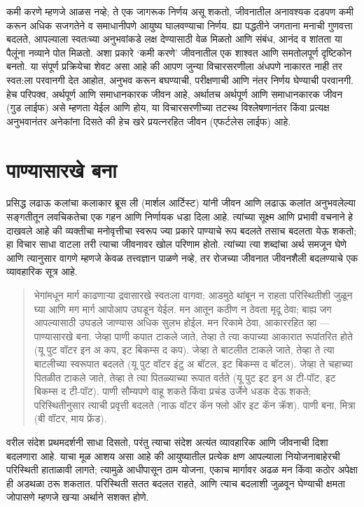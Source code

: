 कमी करणे म्हणजे आळस नव्हे; ते एक जागरूक निर्णय असू शकतो, जीवनातील अनावश्यक दडपण कमी करून अधिक सजगतेने व समाधानीपणे आयुष्य घालवण्याचा निर्णय. ह्या पद्धतीने जगताना मनाची गुणवत्ता बदलते, आपल्याला स्वतःच्या अनुभवांकडे लक्ष देण्यासाठी वेळ मिळतो आणि संबंध, आनंद व शांतता या पैलूंना नव्याने पोत मिळतो. अशा प्रकारे ‘कमी करणे’ जीवनातील एक शाश्वत आणि समतोलपूर्ण दृष्टिकोन बनतो.
या संपूर्ण प्रक्रियेचा शेवट असा आहे की आपण जुन्या विचारसरणीला अंधपणे नाकारत नाही तर स्वत:ला परवानगी देत आहोत, अनुभव करून बघण्याची, परीक्षणाची आणि नंतर निर्णय घेण्याची परवानगी. हेच परिपक्व, अर्थपूर्ण आणि समाधानकारक जीवन आहे, अर्थातच अर्थपूर्ण आणि समाधानकारक जीवन (गुड लाईफ) असे म्हणता येईल आणि होय, या विचारसरणीच्या तटस्थ विश्लेषणानंतर किंवा प्रत्यक्ष अनुभवानंतर अनेकांना दिसते की हेच खरे प्रयत्नरहित जीवन (एफर्टलेस लाईफ) आहे.
\chapter{पाण्यासारखे बना}
प्रसिद्ध लढाऊ कलांचा कलाकार ब्रूस ली (मार्शल आर्टिस्ट) यांनी जीवन आणि लढाऊ कलांत अनुभवलेल्या सङ्गतीतून लवचिकतेचा एक गहन आणि निर्णायक धडा दिला आहे. त्यांच्या सूक्ष्म आणि प्रभावी वचनाने हे दाखवले आहे की व्यक्तीचा मनोवृत्तीचा स्वरूप ज्या प्रकारे पाण्याचे रूप बदलते तसाच बदलता येऊ शकतो; हा विचार साधा वाटला तरी त्याचा जीवनावर खोल परिणाम होतो. त्यांच्या त्या शब्दांचा अर्थ समजून घेणे आणि त्यानुसार वागणे म्हणजे केवळ तत्त्वज्ञान पाळणे नव्हे, तर रोजच्या जीवनात जीवनशैली बदलण्याचे एक व्यावहारिक सूत्र आहे.
\begin{quote}
 भेगांमधून मार्ग काढणाऱ्या द्रवासारखे स्वतःला वागवा; आडमुठे थांबून न राहता परिस्थितीशी जुळून घ्या आणि मग मार्ग आपोआप उघडून येईल.
 मन आतून कठीण न ठेवता मृदू ठेवा; बाह्य जग आपल्यासाठी उघडले जाण्यास अधिक सुलभ होईल.
 मन रिकामे ठेवा, आकाररहित व्हा — पाण्यासारखे बना.
 जेव्हा पाणी कपात टाकले जाते, तेव्हा ते त्या कपाच्या आकारात रूपांतरित होते (यू पुट वॉटर इन अ कप, इट बिकम्स द कप).
 जेव्हा ते बाटलीत टाकले जाते, तेव्हा ते त्या बाटलीच्या स्वरूपात बदलते (यू पुट वॉटर इंटु अ बॉटल, इट बिकम्स द बॉटल).
 जेव्हा ते चहाच्या पितळीत टाकले जाते, तेव्हा ते त्या पितळ्याच्या रूपात वर्तते (यू पुट इट इन अ टी-पॉट, इट बिकम्स द टी-पॉट).
 पाणी सौम्यपणे वाहू शकते किंवा प्रचंड उर्जेने धडक देऊ शकते; परिस्थितीनुसार त्याची प्रवृत्ती बदलते (नाऊ वॉटर कॅन फ्लो ऑर इट कॅन क्रॅश).
 पाणी बना, मित्रा (बी वॉटर, माय फ्रेंड).
 \end{quote}
वरील संदेश प्रथमदर्शनी साधा दिसतो, परंतु त्याचा संदेश अत्यंत व्यावहारिक आणि जीवनाची दिशा बदलणारा आहे. याचा मूळ आशय असा आहे की आयुष्यातील प्रत्येक क्षण आपल्याला नियोजनाबाहेरची परिस्थिती हाताळावी लागते; त्यामुळे आधीपासून ठाम योजना, एकाच मार्गावर अढळ मन किंवा कठोर अपेक्षा ही अडथळा ठरू शकतात. परिस्थिती सतत बदलत राहते, आणि त्याच बदलाशी जुळवून घेण्याची क्षमता जोपासणे म्हणजे खऱ्या अर्थाने सशक्त होणे.
